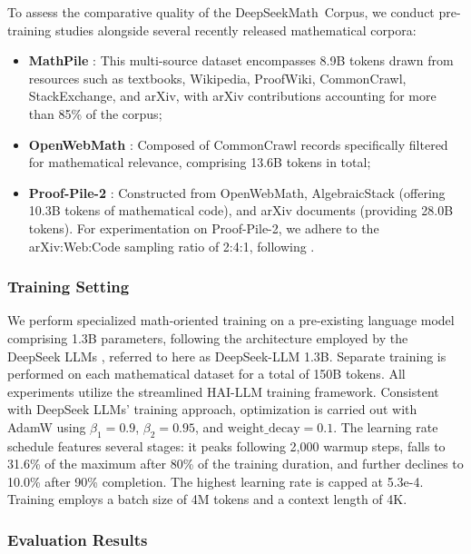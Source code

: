 To assess the comparative quality of the DeepSeekMath~Corpus, we conduct pre-training studies alongside several recently released mathematical corpora:

\begin{itemize}[topsep=0pt]
    \item \textbf{MathPile} \citep{mathpile}: This multi-source dataset encompasses 8.9B tokens drawn from resources such as textbooks, Wikipedia, ProofWiki, CommonCrawl, StackExchange, and arXiv, with arXiv contributions accounting for more than 85\% of the corpus;
    \item \textbf{OpenWebMath} \citep{openwebmath}: Composed of CommonCrawl records specifically filtered for mathematical relevance, comprising 13.6B tokens in total;
    \item \textbf{Proof-Pile-2} \citep{llemma}: Constructed from OpenWebMath, AlgebraicStack (offering 10.3B tokens of mathematical code), and arXiv documents (providing 28.0B tokens). For experimentation on Proof-Pile-2, we adhere to the arXiv:Web:Code sampling ratio of 2:4:1, following \cite{llemma}.
\end{itemize}

\subsubsection{Training Setting}
\label{sec:quality-policy}
We perform specialized math-oriented training on a pre-existing language model comprising 1.3B parameters, following the architecture employed by the DeepSeek LLMs \citep{deepseek-llm}, referred to here as DeepSeek-LLM 1.3B. Separate training is performed on each mathematical dataset for a total of 150B tokens. All experiments utilize the streamlined HAI-LLM \citep{haillm} training framework. Consistent with DeepSeek LLMs' training approach, optimization is carried out with AdamW \citep{adamW} using $\beta_1=0.9$, $\beta_2=0.95$, and $\mathrm{weight\_decay}=0.1$. The learning rate schedule features several stages: it peaks following 2,000 warmup steps, falls to 31.6\% of the maximum after 80\% of the training duration, and further declines to 10.0\% after 90\% completion. The highest learning rate is capped at 5.3e-4. Training employs a batch size of 4M tokens and a context length of 4K.

\subsubsection{Evaluation Results}

